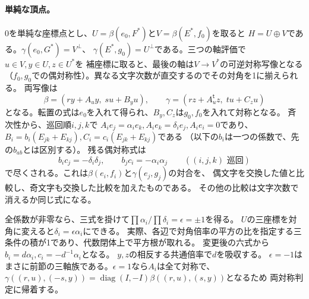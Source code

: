\paragraph{単純な頂点。}
$0$を単純な座標点とし、$U=\beta(e_0,F^*)$と$V=\beta(E^*,f_0)$を取ると
$H=U\oplus V$である。$\gamma(e_0,G^*)=V^\perp$、
$\gamma(E^*,g_0)=U^\perp$である。三つの軸評価で$u\in V,y\in U,z\in U^*$を
補座標に取ると、最後の軸は$V\to V^*$の可逆対称写像となる
（$f_0,g_0$での偶対称性）。異なる文字次数が直交するのでその対角を1に揃えられる。
両写像は
\[
 \beta=(r y+A_u y,\;s u+B_y u),\qquad
 \gamma=(r z+A_u^{\mathsf t}z,\;t u+C_z u)
\]
となる。転置の式は$e_0$を入れて得られ、$B_y,C_z$は$g_0,f_0$を入れて対称となる。
斉次性から、巡回順$i,j,k$で
$A_i e_j=\alpha_i e_k, A_i e_k=\delta_i e_j, A_i e_i=0$であり、
$B_i=b_i(E_{jk}+E_{kj}), C_i=c_i(E_{jk}+E_{kj})$である
（以下の$b_i$は一つの係数で、先の$b_{ab}$とは区別する）。
残る偶対称式は
\begin{equation}\label{eq:klein-flat-coefficients}
 b_i c_j=-\delta_i\delta_j,\qquad b_j c_i=-\alpha_i\alpha_j
 \qquad((i,j,k)\text{ 巡回})
\end{equation}
で尽くされる。これは$\beta(e_i,f_i)$と$\gamma(e_j,g_j)$の対合を、
偶文字を交換した値と比較し、奇文字も交換した比較を加えたものである。
その他の比較は文字次数で消えるか同じ式になる。

全係数が非零なら、三式を掛けて$\prod\alpha_i/\prod\delta_i=\epsilon=\pm1$を得る。
$U$の三座標を対角に変えると$\delta_i=\epsilon\alpha_i$にできる。
実際、各辺で対角倍率の平方の比を指定する三条件の積が1であり、代数閉体上で平方根が取れる。
変更後の六式から$b_i=d\alpha_i,c_i=-d^{-1}\alpha_i$となる。
$y,z$の相反する共通倍率で$d$を吸収する。
$\epsilon=-1$はまさに前節の三軸族である。$\epsilon=1$なら$A_i$は全て対称で、
$\gamma((r,u),(-s,y))=\operatorname{diag}(I,-I)\beta((r,u),(s,y))$となるため
両対称判定に帰着する。

